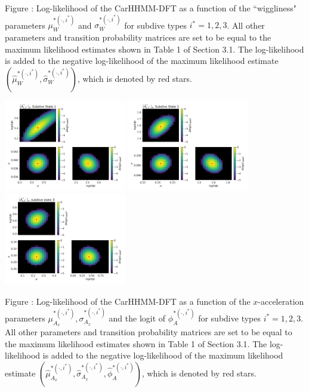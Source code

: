 \documentclass{article}
\begin{document}
        \noindent Figure : Log-likelihood of the CarHHMM-DFT as a function of the ``wiggliness" parameters $\mu_W^{*(\cdot,i^*)}$ and $\sigma_W^{*(\cdot,i^*)}$ for subdive types $i^* = 1,2,3$. All other parameters and transition probability matrices are set to be equal to the maximum likelihood estimates shown in Table 1 of Section 3.1. The log-likelihood is added to the negative log-likelihood of the maximum likelihood estimate $(\hat \mu_W^{*(\cdot,i^*)}, \hat \sigma_W^{*(\cdot,i^*)})$, which is denoted by red stars.
        \addtocounter{fignum}{1}
        
        \newpage
        
        \begin{center}
        \includegraphics[width=2.1in]{../Plots/2019/20190902-182840-CATs_OB_1_0_267_CarHHMM2_fine-theta-likelihood-Ax-0.png}
        \includegraphics[width=2.1in]{../Plots/2019/20190902-182840-CATs_OB_1_0_267_CarHHMM2_fine-theta-likelihood-Ax-1.png}
        \includegraphics[width=2.1in]{../Plots/2019/20190902-182840-CATs_OB_1_0_267_CarHHMM2_fine-theta-likelihood-Ax-2.png}
        \end{center}
        
        \noindent Figure : Log-likelihood of the CarHHMM-DFT as a function of the $x$-acceleration parameters $\mu_{A_x}^{*(\cdot,i^*)}, \sigma_{A_x}^{*(\cdot,i^*)}$ and the logit of $\phi_{A}^{*(\cdot,i^*)}$ for subdive types $i^* = 1,2,3$. All other parameters and transition probability matrices are set to be equal to the maximum likelihood estimates shown in Table 1 of Section 3.1. The log-likelihood is added to the negative log-likelihood of the maximum likelihood estimate $(\hat \mu_{A_x}^{*(\cdot,i^*)}, \hat \sigma_{A_x}^{*(\cdot,i^*)}, \hat \phi_{A}^{*(\cdot,i^*)})$, which is denoted by red stars.
        \addtocounter{fignum}{1}
        
\end{document}
